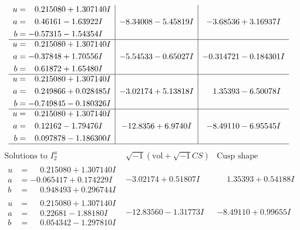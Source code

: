 \documentclass[1p]{elsarticle_modified}
\theoremstyle{definition}
\newcommand{\I}{\sqrt{-1}}
\begin{document}
$$\begin{array}{c|c|c}
\begin{aligned}
u &= \phantom{-}0.215080 + 1.307140 I \\
a &= \phantom{-}0.46161 - 1.63922 I \\
b &= -0.57315 - 1.54354 I\end{aligned}
 & -8.34008 - 5.45819 I & -3.68536 + 3.16937 I \\ \hline\begin{aligned}
u &= \phantom{-}0.215080 + 1.307140 I \\
a &= -0.37848 + 1.70556 I \\
b &= \phantom{-}0.61872 + 1.65480 I\end{aligned}
 & -5.54533 - 0.65027 I & -0.314721 - 0.184301 I \\ \hline\begin{aligned}
u &= \phantom{-}0.215080 + 1.307140 I \\
a &= \phantom{-}0.249866 + 0.028485 I \\
b &= -0.749845 - 0.180326 I\end{aligned}
 & -3.02174 + 5.13818 I & \phantom{-}1.35393 - 6.50078 I \\ \hline\begin{aligned}
u &= \phantom{-}0.215080 + 1.307140 I \\
a &= \phantom{-}0.12162 - 1.79476 I \\
b &= \phantom{-}0.097878 - 1.186300 I\end{aligned}
 & -12.8356 + 6.9740 I & -8.49110 - 6.95545 I\\
 \hline 
 \end{array}$$\newpage$$\begin{array}{c|c|c}  
\text{Solutions to }I^u_{2}& \I (\text{vol} + \sqrt{-1}CS) & \text{Cusp shape}\\
 \hline 
\begin{aligned}
u &= \phantom{-}0.215080 + 1.307140 I \\
a &= -0.065417 + 0.174229 I \\
b &= \phantom{-}0.948493 + 0.296744 I\end{aligned}
 & -3.02174 + 0.51807 I & \phantom{-}1.35393 + 0.54188 I \\ \hline\begin{aligned}
u &= \phantom{-}0.215080 + 1.307140 I \\
a &= \phantom{-}0.22681 - 1.88180 I \\
b &= \phantom{-}0.054342 - 1.297810 I\end{aligned}
 & -12.83560 - 1.31773 I & -8.49110 + 0.99655 I \\ \hline\begin{aligned}

\end{aligned}
\end{array}$$
\end{document}
